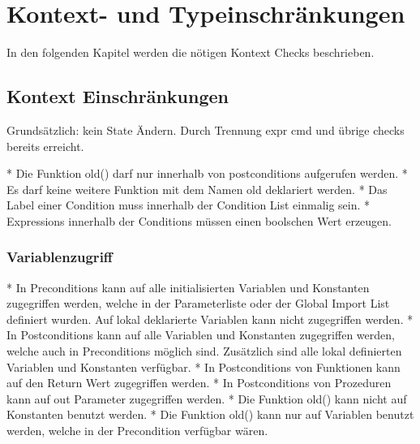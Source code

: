 \section{Kontext- und Typeinschränkungen}
\label{sec:constraints}
In den folgenden Kapitel werden die nötigen Kontext Checks beschrieben.

\subsection{Kontext Einschränkungen}

Grundsätzlich: kein State Ändern. Durch Trennung expr cmd  und übrige checks bereits erreicht.

* Die Funktion old() darf nur innerhalb von postconditions aufgerufen werden.
* Es darf keine weitere Funktion mit dem Namen old deklariert werden.
* Das Label einer Condition muss innerhalb der Condition List einmalig sein.
* Expressions innerhalb der Conditions müssen einen boolschen Wert erzeugen.

\subsubsection{Variablenzugriff}

* In Preconditions kann auf alle initialisierten Variablen und Konstanten zugegriffen werden, welche 
in der Parameterliste oder der Global Import List definiert wurden. Auf lokal deklarierte Variablen 
kann nicht zugegriffen werden.
* In Postconditions kann auf alle Variablen und Konstanten zugegriffen werden, welche auch in 
Preconditions möglich sind. Zusätzlich sind alle lokal definierten Variablen und Konstanten verfügbar.
* In Postconditions von Funktionen kann auf den Return Wert zugegriffen werden.
* In Postconditions von Prozeduren kann auf out Parameter zugegriffen werden.
* Die Funktion old() kann nicht auf Konstanten benutzt werden.
* Die Funktion old() kann nur auf Variablen benutzt werden, welche in der Precondition verfügbar wären.



